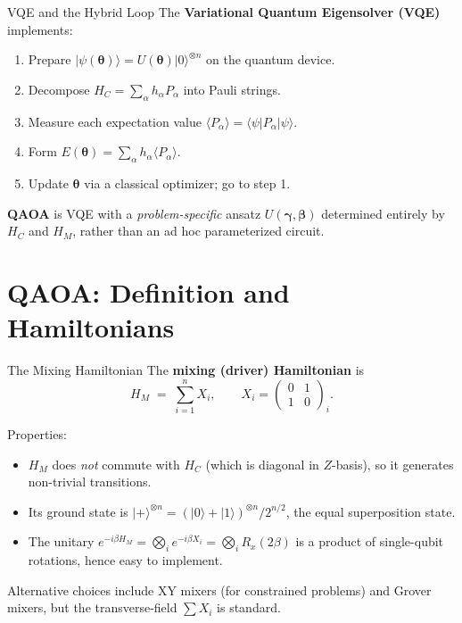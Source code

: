 \documentclass{beamer}
\begin{document}

\begin{frame}{VQE and the Hybrid Loop}
The \textbf{Variational Quantum Eigensolver (VQE)} implements:

\begin{enumerate}
\item Prepare $|\psi(\boldsymbol{\theta})\rangle = U(\boldsymbol{\theta})|0\rangle^{\otimes n}$
  on the quantum device.
\item Decompose $H_C = \sum_\alpha h_\alpha P_\alpha$ into Pauli strings.
\item Measure each expectation value
  $\langle P_\alpha\rangle = \langle\psi|P_\alpha|\psi\rangle$.
\item Form $E(\boldsymbol{\theta}) = \sum_\alpha h_\alpha \langle P_\alpha\rangle$.
\item Update $\boldsymbol{\theta}$ via a classical optimizer; go to step 1.
\end{enumerate}

\medskip

\textbf{QAOA} is VQE with a \emph{problem-specific} ansatz
$U(\boldsymbol{\gamma},\boldsymbol{\beta})$ determined entirely by
$H_C$ and $H_M$, rather than an ad hoc parameterized circuit.
\end{frame}


\section{QAOA: Definition and Hamiltonians}

\begin{frame}{The Mixing Hamiltonian}
The \textbf{mixing (driver) Hamiltonian} is
\[
H_M \;=\; \sum_{i=1}^n X_i, \qquad
X_i = \begin{pmatrix}0&1\\1&0\end{pmatrix}_i.
\]

Properties:
\begin{itemize}
\item $H_M$ does \emph{not} commute with $H_C$ (which is diagonal in
  $Z$-basis), so it generates non-trivial transitions.
\item Its ground state is $|+\rangle^{\otimes n} =
  (|0\rangle+|1\rangle)^{\otimes n}/2^{n/2}$, the equal
  superposition state.
\item The unitary $e^{-i\beta H_M} = \bigotimes_i e^{-i\beta X_i} =
  \bigotimes_i R_x(2\beta)$ is a product of single-qubit rotations,
  hence easy to implement.
\end{itemize}

Alternative choices include XY mixers (for constrained problems) and
Grover mixers, but the transverse-field $\sum X_i$ is standard.
\end{frame}
\end{document}
